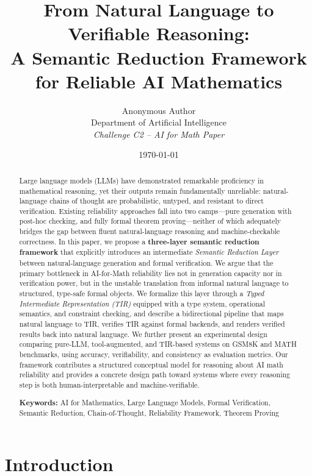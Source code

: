 \documentclass[11pt,a4paper]{article}
\title{\textbf{From Natural Language to Verifiable Reasoning:\\A Semantic Reduction Framework for Reliable AI Mathematics}}
\author{
Anonymous Author \\
Department of Artificial Intelligence \\
\textit{Challenge C2 -- AI for Math Paper}
}
\date{\today}
\begin{document}
\maketitle

\begin{abstract}
Large language models (LLMs) have demonstrated remarkable proficiency in mathematical reasoning, yet their outputs remain fundamentally unreliable: natural-language chains of thought are probabilistic, untyped, and resistant to direct verification. Existing reliability approaches fall into two camps---pure generation with post-hoc checking, and fully formal theorem proving---neither of which adequately bridges the gap between fluent natural-language reasoning and machine-checkable correctness. In this paper, we propose a \textbf{three-layer semantic reduction framework} that explicitly introduces an intermediate \textit{Semantic Reduction Layer} between natural-language generation and formal verification. We argue that the primary bottleneck in AI-for-Math reliability lies not in generation capacity nor in verification power, but in the unstable translation from informal natural language to structured, type-safe formal objects. We formalize this layer through a \textit{Typed Intermediate Representation (TIR)} equipped with a type system, operational semantics, and constraint checking, and describe a bidirectional pipeline that maps natural language to TIR, verifies TIR against formal backends, and renders verified results back into natural language. We further present an experimental design comparing pure-LLM, tool-augmented, and TIR-based systems on GSM8K and MATH benchmarks, using accuracy, verifiability, and consistency as evaluation metrics. Our framework contributes a structured conceptual model for reasoning about AI math reliability and provides a concrete design path toward systems where every reasoning step is both human-interpretable and machine-verifiable.

\vspace{0.5em}
\noindent\textbf{Keywords:} AI for Mathematics, Large Language Models, Formal Verification, Semantic Reduction, Chain-of-Thought, Reliability Framework, Theorem Proving
\end{abstract}

\section{Introduction}
\label{sec:intro}
\end{document}
